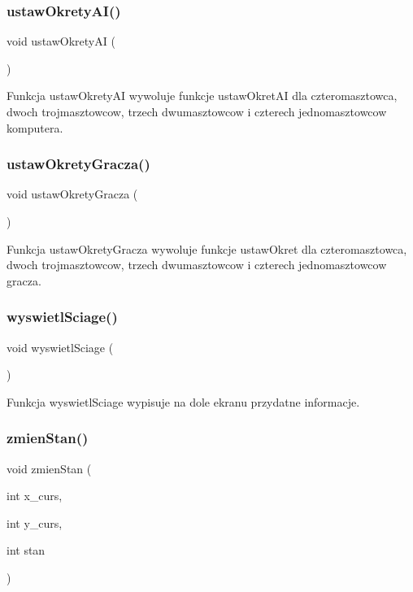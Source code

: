 \subsubsection{ustaw\+Okrety\+A\+I()}
{\footnotesize\ttfamily void ustaw\+Okrety\+AI (\begin{DoxyParamCaption}{ }\end{DoxyParamCaption})}



Funkcja ustaw\+Okrety\+AI wywoluje funkcje ustaw\+Okret\+AI dla czteromasztowca, dwoch trojmasztowcow, trzech dwumasztowcow i czterech jednomasztowcow komputera. 

\mbox{\label{znaki_8c_a4076458d0a6a28ae914d9ed429129ec6}} 
\subsubsection{ustaw\+Okrety\+Gracza()}
{\footnotesize\ttfamily void ustaw\+Okrety\+Gracza (\begin{DoxyParamCaption}{ }\end{DoxyParamCaption})}



Funkcja ustaw\+Okrety\+Gracza wywoluje funkcje ustaw\+Okret dla czteromasztowca, dwoch trojmasztowcow, trzech dwumasztowcow i czterech jednomasztowcow gracza. 

\mbox{\label{znaki_8c_a5075930681628e334abe78a15221fa56}} 
\subsubsection{wyswietl\+Sciage()}
{\footnotesize\ttfamily void wyswietl\+Sciage (\begin{DoxyParamCaption}{ }\end{DoxyParamCaption})}



Funkcja wyswietl\+Sciage wypisuje na dole ekranu przydatne informacje. 

\mbox{\label{znaki_8c_a541a3103b5eb12b2c413c09a684f238c}} 
\subsubsection{zmien\+Stan()}
{\footnotesize\ttfamily void zmien\+Stan (\begin{DoxyParamCaption}\item[{int}]{x\+\_\+curs,  }\item[{int}]{y\+\_\+curs,  }\item[{int}]{stan }\end{DoxyParamCaption})}

